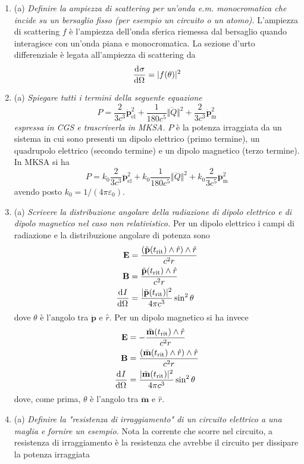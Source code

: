 \documentclass{article}
\renewcommand{\a}{(a)}
\renewcommand{\t}[1]{\textit{ #1}}
\renewcommand{\vec}[1]{\mathbf{#1}}
\begin{document}
\begin{enumerate}
		\item\a\t{Definire la ampiezza di scattering per un’onda e.m. monocromatica che incide su
			un bersaglio fisso (per esempio un circuito o un atomo).} L'ampiezza di scattering $f$ è l'ampiezza dell'onda sferica riemessa dal bersaglio quando interagisce con un'onda piana e monocromatica. La sezione d'urto differenziale è legata all'ampiezza di scattering da
			\[\dfrac{\mathrm{d} ^{}\sigma}{\mathrm{d} {\Omega}^{}}=|f(\theta)|^2\]
		\item\a\t{Spiegare tutti i termini della seguente equazione \[P = \frac{2}{3c^3}\ddot{\vec{p}}_\textrm{el}^2+ \frac{1}{180 c^5}\Vert\dddot{Q}\Vert^2+\frac{2}{3c^3}\ddot{\vec{p}}_\textrm{m}^2
			\] espressa
			in CGS e trascriverla in MKSA.}
		$P$ è la potenza irraggiata da un sistema in cui sono presenti un dipolo elettrico (primo termine), un quadrupolo elettrico (secondo termine) e un dipolo magnetico (terzo termine). In MKSA si ha
		\[P=k_0\frac{2}{3c^3}\ddot{\vec{p}}_\textrm{el}^2+ k_0\frac{1}{180 c^5}\Vert\dddot{Q}\Vert^2+k_0\frac{2}{3c^5}\ddot{\vec{p}}_\textrm{m}^2\]
		avendo posto $k_0=1/(4\pi\varepsilon_0)$.
		\item\a\t{Scrivere la distribuzione angolare della radiazione di dipolo elettrico e di dipolo
			magnetico nel caso non relativistico.}
		Per un dipolo elettrico i campi di radiazione e la distribuzione angolare di potenza sono
		\begin{align*}
			\vec{E}&=\frac{(\ddot{\vec{p}}(t_\textrm{rit})\wedge\hat{r})\wedge\hat{r}}{c^2r}\\
			\vec{B}&=\frac{\ddot{\vec{p}}(t_\textrm{rit})\wedge\hat{r}}{c^2r}\\
			\der{I}{\Omega}&=\frac{|\ddot{\vec{p}}(t_\textrm{rit})|^2}{4\pi c^3}\sin^2\theta
		\end{align*}
		dove $\theta$ è l'angolo tra $\ddot{\vec{p}}$ e $\hat{r}$. Per un dipolo magnetico si ha invece
		\begin{align*}
		\vec{E}&=-\frac{\ddot{\vec{m}}(t_\textrm{rit})\wedge\hat{r}}{c^2r}\\
		\vec{B}&=\frac{(\ddot{\vec{m}}(t_\textrm{rit})\wedge\hat{r})\wedge\hat{r}}{c^2r}\\
		\der{I}{\Omega}&=\frac{|\ddot{\vec{m}}(t_\textrm{rit})|^2}{4\pi c^3}\sin^2\theta
		\end{align*}
		dove, come prima, $\theta$ è l'angolo tra $\ddot{\vec{m}}$ e $\hat{r}$.
		\item\a\t{Definire la "resistenza di irraggiamento" di un circuito elettrico a una maglia e
			fornire un esempio.}
		Nota la corrente che scorre nel circuito, a resistenza di irraggiamento è la resistenza che avrebbe il circuito per dissipare la potenza irraggiata

\end{enumerate}
\end{document}
